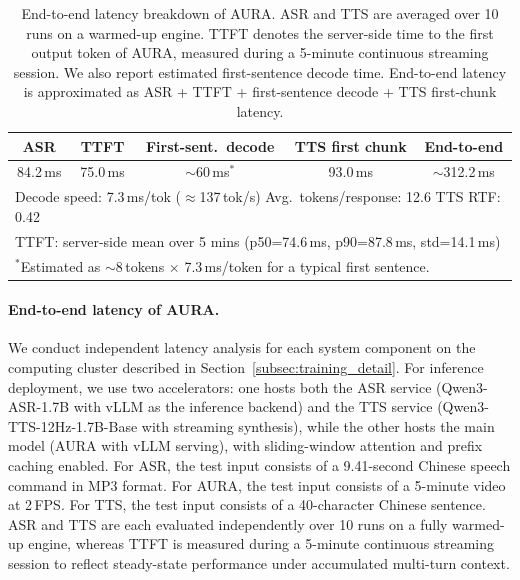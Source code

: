 \begin{table}[t]
  \renewcommand{\arraystretch}{1.2}
  \caption{End-to-end latency breakdown of AURA. ASR and TTS are averaged over 10 runs on a warmed-up engine. TTFT denotes the server-side time to the first output token of AURA, measured during a 5-minute continuous streaming session. We also report estimated first-sentence decode time. End-to-end latency is approximated as ASR + TTFT + first-sentence decode + TTS first-chunk latency.}
  \label{tab:inference_comparison}
  \centering
  \footnotesize
  \begin{tabular}{ccccc}
    \toprule
    ASR & TTFT & First-sent.\ decode & TTS first chunk & End-to-end \\
    \midrule
    84.2\,ms & 75.0\,ms & $\sim$60\,ms$^*$ & 93.0\,ms & $\sim$312.2\,ms \\
    \bottomrule
    \multicolumn{5}{l}{\scriptsize Decode speed: 7.3\,ms/tok ($\approx$137\,tok/s) \quad Avg.\ tokens/response: 12.6 \quad TTS RTF: 0.42} \\
    \multicolumn{5}{l}{\scriptsize TTFT: server-side mean over 5 mins (p50=74.6\,ms, p90=87.8\,ms, std=14.1\,ms)} \\
    \multicolumn{5}{l}{\scriptsize $^*$Estimated as $\sim$8\,tokens $\times$ 7.3\,ms/token for a typical first sentence.} \\
  \end{tabular}
\end{table}

\paragraph{End-to-end latency of AURA.}
We conduct independent latency analysis for each system component on the computing cluster described in Section~\ref{subsec:training_detail}. For inference deployment, we use two accelerators: one hosts both the ASR service (Qwen3-ASR-1.7B with vLLM as the inference backend) and the TTS service (Qwen3-TTS-12Hz-1.7B-Base with streaming synthesis), while the other hosts the main model (AURA with vLLM serving), with sliding-window attention and prefix caching enabled. For ASR, the test input consists of a 9.41-second Chinese speech command in MP3 format. For AURA, the test input consists of a 5-minute video at 2\,FPS. For TTS, the test input consists of a 40-character Chinese sentence. ASR and TTS are each evaluated independently over 10 runs on a fully warmed-up engine, whereas TTFT is measured during a 5-minute continuous streaming session to reflect steady-state performance under accumulated multi-turn context.

